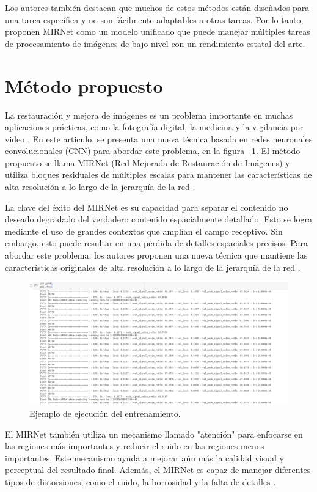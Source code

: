 \documentclass[a4paper,
               ]{jacow}
\begin{document}
Los autores también destacan que muchos de estos métodos están diseñados para una tarea específica y no son fácilmente adaptables a otras tareas. Por lo tanto, proponen MIRNet como un modelo unificado que puede manejar múltiples tareas de procesamiento de imágenes de bajo nivel con un rendimiento estatal del arte.

\section{Método propuesto}
La restauración y mejora de imágenes es un problema importante en muchas aplicaciones prácticas, como la fotografía digital, la medicina y la vigilancia por video \cite{zhang2017beyond}. En este articulo, se presenta una nueva técnica basada en redes neuronales convolucionales (CNN) para abordar este problema, en la figura ~\ref{fig:ejem_Entrenamiento}. El método propuesto se llama MIRNet (Red Mejorada de Restauración de Imágenes) y utiliza bloques residuales de múltiples escalas para mantener las características de alta resolución a lo largo de la jerarquía de la red \cite{tian2020learning}.

La clave del éxito del MIRNet es su capacidad para separar el contenido no deseado degradado del verdadero contenido espacialmente detallado. Esto se logra mediante el uso de grandes contextos que amplían el campo receptivo. Sin embargo, esto puede resultar en una pérdida de detalles espaciales precisos. Para abordar este problema, los autores proponen una nueva técnica que mantiene las características originales de alta resolución a lo largo de la jerarquía de la red \cite{tian2020learning}.


\begin{figure}[!tbh]
    \centering 
    \includegraphics*[width=.7\textwidth]{ll-training-3}
    \caption{Ejemplo de ejecución del entrenamiento.}
    \label{fig:ejem_Entrenamiento}
\end{figure}


 El MIRNet también utiliza un mecanismo llamado "atención" para enfocarse en las regiones más importantes y reducir el ruido en las regiones menos importantes. Este mecanismo ayuda a mejorar aún más la calidad visual y perceptual del resultado final. Además, el MIRNet es capaz de manejar diferentes tipos de distorsiones, como el ruido, la borrosidad y la falta de detalles \cite{tian2020learning}.
\end{document}
